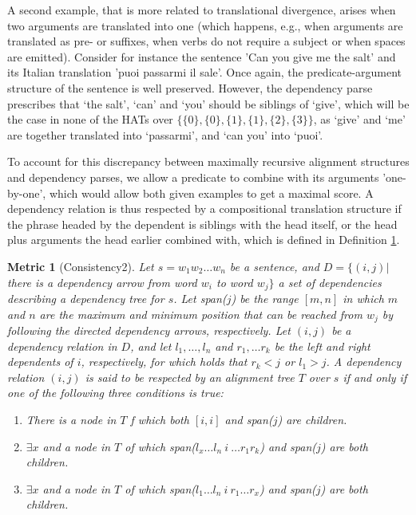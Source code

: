 \documentclass{report}
\theoremstyle{break}
\newtheorem{metric}{Metric}
\begin{document}
A second example, that is more related to translational divergence, arises when two arguments are translated into one (which happens, e.g., when arguments are translated as pre- or suffixes, when verbs do not require a subject or when spaces are emitted). Consider for instance the sentence 'Can you give me the salt' and its Italian translation 'puoi passarmi il sale'. Once again, the predicate-argument structure of the sentence is well preserved. However, the dependency parse prescribes that `the salt', `can' and `you' should be siblings of `give', which will be the case in none of the HATs over $\{\{0\},\{0\},\{1\},\{1\},\{2\},\{3\}\}$, as `give' and `me' are together translated into `passarmi', and `can you' into `puoi'.

To account for this discrepancy between maximally recursive alignment structures and dependency parses, we allow a predicate to combine with its arguments 'one-by-one', which would allow both given examples to get a maximal score. A dependency relation is thus respected by a compositional translation structure if the phrase headed by the dependent is siblings with the head itself, or the head plus arguments the head earlier combined with, which is defined in Definition \ref{met:depHAT2}.

\begin{metric}[Consistency2]\label{met:depHAT2}
Let $s = w_1 w_2 \dots w_n$ be a sentence, and $D = \{ (i,j) |$ there is a dependency arrow from word $w_i$ to word $w_j \}$ a set of dependencies describing a dependency tree for $s$. Let span($j$) be the range $[m,n]$ in which $m$ and $n$ are the maximum and minimum position that can be reached from $w_j$ by following the directed dependency arrows, respectively. Let $(i,j)$ be a dependency relation in $D$, and let $l_1,\ldots,l_n$ and $r_1,\ldots r_k$ be the left and right dependents of $i$, respectively, for which holds that $r_k < j$ or $l_1 > j$. A dependency relation $(i,j)$ is said to be respected by an alignment tree $T$ over $s$ if and only if one of the following three conditions is true: \begin{enumerate}
\item There is a node in $T$ f which both $[i,i]$ and span($j$) are children.
\item $\exists x$  and a node in $T$ of which span($l_x\ldots l_n~i~\ldots r_1 r_k$) and span($j$) are both children.
\item $\exists x$  and a node in $T$ of which span($l_1\ldots l_n~i~r_1\ldots r_x$) and span($j$) are both children.
\end{enumerate} 
\end{metric}
\end{document}

